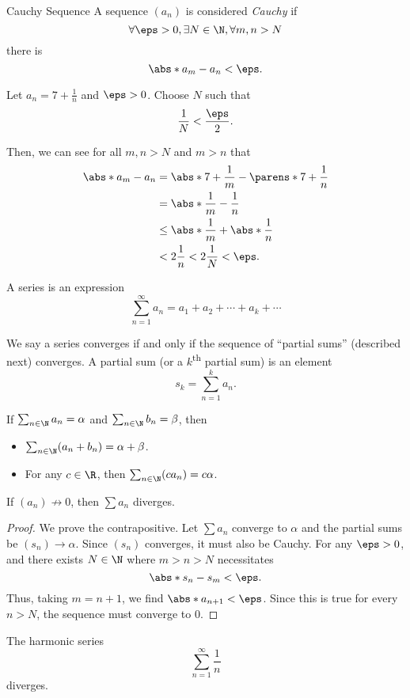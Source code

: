 \documentclass{article}
\begin{document}
\begin{defn}{Cauchy Sequence}{}
  A sequence $(a_{n})$ is considered \emph{Cauchy} if
  \[
    \forall \eps > 0, \exists N \in \N, \forall m,n > N
  \]
  there is
  \[
    \abs*{a_{m} - a_{n}} < \eps.
  \]
\end{defn}

\begin{ex}
  Let $a_{n} = 7 + \frac{1}{n}$ and $\eps > 0$.
  Choose $N$ such that
  \[
    \frac{1}{N} < \frac{\eps}{2}.
  \]

  Then, we can see for all $m, n > N$ and $m > n$ that
  \begin{align*}
    \abs*{a_{m} - a_{n}} &= \abs*{7 + \frac{1}{m} - \parens*{7 + \frac{1}{n}}}\\
    &= \abs*{\frac{1}{m} - \frac{1}{n}}\\
    &\le \abs*{\frac{1}{m}} + \abs*{\frac{1}{n}}\\
    &< 2\frac{1}{n} < 2\frac{1}{N} < \eps.
  \end{align*}
\end{ex}

\begin{defn}[Series]
  A series is an expression
  \[
    \sum_{n = 1}^{\infty}a_{n} = a_{1} + a_{2} + \cdots + a_{k} + \cdots
  \]

  We say a series converges if and only if the sequence of ``partial sums'' (described next) converges.
  A partial sum (or a $k$\textsuperscript{th} partial sum) is an element
  \[
    s_{k} = \sum_{n = 1}^{k}a_{n}.
  \]
\end{defn}
\begin{prop}
  If $\sum_{n \in \N} a_{n} = \alpha$ and $\sum_{n \in \N} b_{n} = \beta$, then
  \begin{itemize}
    \item $\sum_{n \in \N} (a_{n} + b_{n}) = \alpha + \beta$.
    \item For any $c \in \R$, then $\sum_{n \in \N} (ca_{n}) = c\alpha$.
  \end{itemize}
\end{prop}

\begin{prop}
  If $(a_{n}) \not\to 0$, then $\sum a_{n}$ diverges.
  \begin{proof}
    We prove the contrapositive. Let $\sum a_{n}$ converge to $\alpha$ and the partial sums be $(s_{n}) \to \alpha$.
    Since $(s_{n})$ converges, it must also be Cauchy. For any $\eps > 0$, and there exists $N \in \N$ where $m > n > N$
    necessitates
    \[
      \abs*{s_{n} - s_{m}} < \eps.
    \]
    Thus, taking $m = n + 1$, we find $\abs*{a_{n + 1}} < \eps$. Since this is true for every $n > N$, the sequence must converge to 0.
  \end{proof}
\end{prop}
\begin{theorem}
  The harmonic series
  \[
  \sum_{n = 1}^{\infty}\frac{1}{n}
  \]
  diverges.
\end{theorem}
\end{document}
